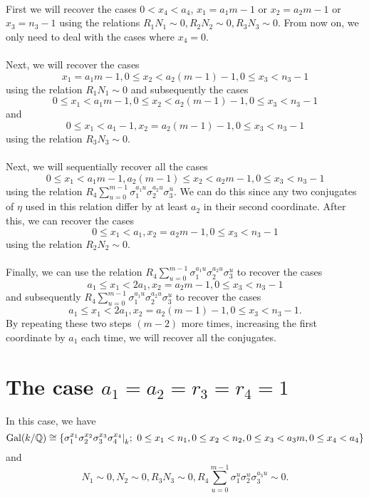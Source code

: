 \documentclass[12pt,a4paper]{article}
\theoremstyle{definition}
\newcommand{\Qbb}{\mathbb{Q}}
\newcommand{\Gal}{\mathrm{Gal}}
\newcommand\restr[2]{{%
  \left.\kern-\nulldelimiterspace %
  #1 %
  \right|_{#2} %
  }}
\begin{document}
\paragraph*{}
First we will recover the cases $0<x_4<a_4$, $x_1=a_1m-1$ or $x_2=a_2m-1$ or $x_3=n_3-1$ using the relations $R_1N_1\sim 0, R_2N_2\sim 0, R_3N_3\sim 0$. From now on, we only need to deal with the cases where $x_4=0$.
\paragraph*{}
Next, we will recover the cases $$x_1=a_1m-1, 0\leq x_2 < a_2(m-1)-1, 0\leq x_3 <n_3-1$$ using the relation $R_1N_1\sim 0$ and subsequently the cases $$0\leq x_1 < a_1m-1, 0\leq x_2 < a_2(m-1)-1, 0\leq x_3 <n_3-1$$ and $$0\leq x_1 < a_1-1, x_2 = a_2(m-1)-1, 0\leq x_3 <n_3-1$$ using the relation $R_3N_3\sim 0$.
\paragraph*{}
Next, we will sequentially recover all the cases $$0\leq x_1 < a_1m-1, a_2(m-1)\leq x_2 < a_2m-1, 0\leq x_3 <n_3-1$$
using the relation $R_4\sum_{u=0}^{m-1}\sigma_1^{a_1u}\sigma_2^{a_2u}\sigma_3^u$. We can do this since any two conjugates of $\eta$ used in this relation differ by at least $a_2$ in their second coordinate. After this, we can recover the cases $$0\leq x_1 < a_1, x_2 = a_2m-1, 0\leq x_3 <n_3-1$$ using the relation $R_2N_2\sim 0$.
\paragraph*{}
Finally, we can use the relation $R_4\sum_{u=0}^{m-1}\sigma_1^{a_1u}\sigma_2^{a_2u}\sigma_3^u$ to recover the cases $$a_1 \leq x_1 <2a_1, x_2 =a_2m-1, 0\leq x_3 <n_3-1$$ and subsequently $R_4\sum_{u=0}^{m-1}\sigma_1^{a_1u}\sigma_2^{a_2u}\sigma_3^u$ to recover the cases $$a_1 \leq x_1 <2a_1, x_2 =a_2(m-1)-1, 0\leq x_3 <n_3-1.$$ By repeating these two steps $(m-2)$ more times, increasing the first coordinate by $a_1$ each time, we will recover all the conjugates.

\section{The case $a_1=a_2=r_3=r_4=1$}
In this case, we have
$$\Gal(k/\Qbb)\cong
 \{\restr{\sigma_1^{x_1}\sigma_2^{x_2}\sigma_3^{x_3}\sigma_4^{x_4}}{k};~  0\leq x_1<n_1, 0\leq x_2<n_2, 0\leq x_3<a_3m,0\leq x_4<a_4\}$$
 and $$N_1\sim 0, N_2\sim 0, R_3N_3 \sim 0, R_4 \sum_{u=0}^{m-1}\sigma_1^u\sigma_2^u\sigma_3^{a_3u} \sim 0.$$
\end{document}
